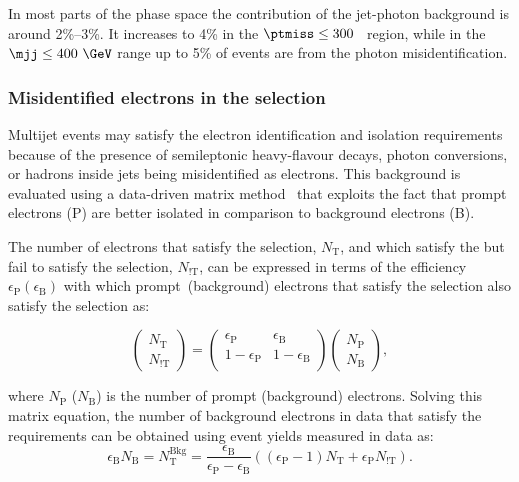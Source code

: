 \documentclass[atlasdraft=false, cernpreprint, UKenglish, texmf, orcidlogo]{atlasdoc}
\begin{document}
In most parts of the phase space the contribution of the jet-photon background is around 2\%--3\%.
It increases to 4\% in the \(\ptmiss\le 300\)~\GeV{} region, while in the \(\mjj\le 400~\GeV\) range up to  5\% of events are  from the photon misidentification.
 
\subsubsection{Misidentified electrons in the \oneeljets selection}
\label{sec:fakeel}
 
Multijet events may satisfy the electron identification and isolation requirements because of the presence of semileptonic heavy-flavour decays, photon conversions, or
hadrons inside jets being misidentified as electrons.
This background is evaluated using a data-driven  matrix method~\cite{EGAM-2019-01} that exploits the fact that prompt electrons (P) are better isolated in
comparison to background electrons (B).
 
The number of electrons that satisfy the  selection,  \(N_\textrm{T}\), and which satisfy the  but fail to satisfy the   selection,
\(N_\textrm{!T}\), can be expressed in terms of the efficiency \( \epsilon_\textrm{P} \left( \epsilon_\textrm{B}\right) \) with which prompt~(background)
electrons that satisfy the  selection also satisfy the  selection as:
 
\begin{equation} \label{eqn:mmstart}
\begin{pmatrix}
N_\textrm{T} \\N_\textrm{!T}
\end{pmatrix}
=
\begin{pmatrix}
\epsilon_\textrm{P}  & \epsilon_\textrm{B} \\
1- \epsilon_\textrm{P}   & 1-\epsilon_\textrm{B} \\
\end{pmatrix}
\begin{pmatrix}
N_\textrm{P} \\N_\textrm{B}
\end{pmatrix},
\end{equation}
 
where  \(N_\textrm{P}\) (\(N_\textrm{B}\))  is the number of prompt (background) electrons.
Solving this matrix equation, the number of background electrons in data that satisfy the  requirements
can be obtained using event yields  measured in data as:
\begin{equation} \label{eqn:mmfinal}
\epsilon_\textrm{B} N_\textrm{B} = N_\textrm{T}^\textrm{Bkg} = \frac{\epsilon_\textrm{B}}{\epsilon_\textrm{P} -\epsilon_\textrm{B}}
\left(  \left(\epsilon_\textrm{P}-1 \right)  N_\textrm{T}  + \epsilon_\textrm{P}N_\textrm{!T}   \right).
\end{equation}
 
\end{document}
